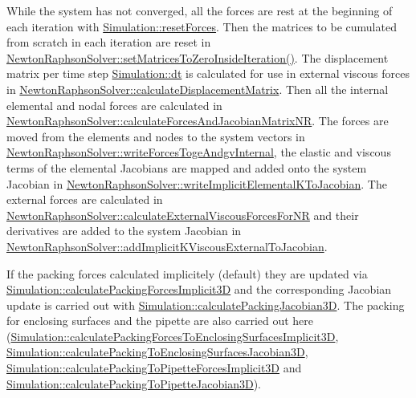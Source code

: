While the system has not converged, all the forces are rest at the beginning of each iteration with \hyperlink{classSimulation_a5c0989e1c64b0fde348701454e9fbf67}{Simulation\+::reset\+Forces}. Then the matrices to be cumulated from scratch in each iteration are reset in \hyperlink{classNewtonRaphsonSolver_a36d647a13f9942e90e288a42c5444c4d}{Newton\+Raphson\+Solver\+::set\+Matrices\+To\+Zero\+Inside\+Iteration()}. The displacement matrix per time step \hyperlink{classSimulation_a0ee381efb3458d02bf78487cbb4dc42a}{Simulation\+::dt} is calculated for use in external viscous forces in \hyperlink{classNewtonRaphsonSolver_aa0ce333a40397fd113f9b9fc47bcb6ca}{Newton\+Raphson\+Solver\+::calculate\+Displacement\+Matrix}. Then all the internal elemental and nodal forces are calculated in \hyperlink{classNewtonRaphsonSolver_a5793ee41a3a4d97c0c944347f1f6da8e}{Newton\+Raphson\+Solver\+::calculate\+Forces\+And\+Jacobian\+Matrix\+N\+R}. The forces are moved from the elements and nodes to the system vectors in \hyperlink{classNewtonRaphsonSolver_aca7345c1d02bf38b1c36cf1f5110f869}{Newton\+Raphson\+Solver\+::write\+Forces\+Toge\+Andgv\+Internal}, the elastic and viscous terms of the elemental Jacobians are mapped and added onto the system Jacobian in \hyperlink{classNewtonRaphsonSolver_a0d6e3a4d0cf1c6e4fdf2753c7f08df13}{Newton\+Raphson\+Solver\+::write\+Implicit\+Elemental\+K\+To\+Jacobian}. The external forces are calculated in \hyperlink{classNewtonRaphsonSolver_ad39200f7babf1a3761a010c1a43f7c22}{Newton\+Raphson\+Solver\+::calculate\+External\+Viscous\+Forces\+For\+N\+R} and their derivatives are added to the system Jacobian in \hyperlink{classNewtonRaphsonSolver_a78759a96ed41bf35e8401b7c63180ea2}{Newton\+Raphson\+Solver\+::add\+Implicit\+K\+Viscous\+External\+To\+Jacobian}. ~\newline


If the packing forces calculated implicitely (default) they are updated via \hyperlink{classSimulation_a77e76f4fe61889b9c0ae18436a7fd2fb}{Simulation\+::calculate\+Packing\+Forces\+Implicit3\+D} and the corresponding Jacobian update is carried out with \hyperlink{classSimulation_a07d76a2495e1b863ab0cdb7185821bec}{Simulation\+::calculate\+Packing\+Jacobian3\+D}. The packing for enclosing surfaces and the pipette are also carried out here (\hyperlink{classSimulation_a3b2d417e1f2814ffd8e34c186508c2f2}{Simulation\+::calculate\+Packing\+Forces\+To\+Enclosing\+Surfaces\+Implicit3\+D}, \hyperlink{classSimulation_a4b259e3827b74767c8005b2126191609}{Simulation\+::calculate\+Packing\+To\+Enclosing\+Surfaces\+Jacobian3\+D}, \hyperlink{classSimulation_af18305ef63492bb7e76f79c4c85206d0}{Simulation\+::calculate\+Packing\+To\+Pipette\+Forces\+Implicit3\+D} and \hyperlink{classSimulation_aeebe76bd38ce67afd3611ad521450c1f}{Simulation\+::calculate\+Packing\+To\+Pipette\+Jacobian3\+D}).

